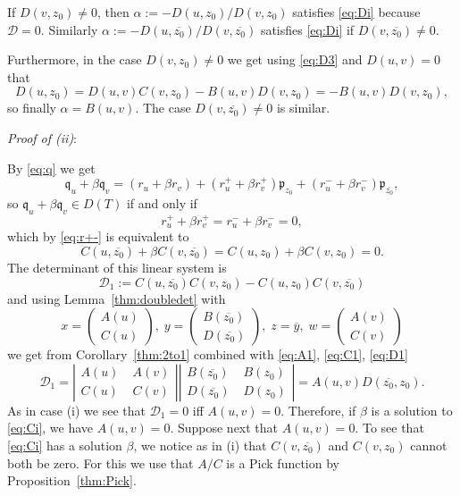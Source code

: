 \documentclass [12pt]{article}
\newcommand{\C}{\mathbb{C}}
\newcommand{\D}{\mathbb{D}}
\begin{document}
If $D(v,z_0)\neq 0$, then $\alpha:=-D(u,z_0)/D(v,z_0)$ satisfies \eqref{eq:Di} because $\mathcal D=0$. Similarly $\alpha:=-D(u,\overline{z_0})/D(v,\overline{z_0})$ satisfies \eqref{eq:Di} if $D(v,\overline{z_0})\neq 0$.

Furthermore, in the case $D(v,z_0)\neq 0$ we get using \eqref{eq:D3} and $D(u,v)=0$ that
$$
D(u,z_0)=D(u,v)C(v,z_0)-B(u,v)D(v,z_0)=-B(u,v)D(v,z_0),
$$
so finally $\alpha=B(u,v)$. The case $D(v,\overline{z_0})\neq 0$ is similar.

\medskip
{\it Proof of (ii)}:

By \eqref{eq:q} we get
$$
\mathfrak{q}_u+\beta \mathfrak{q}_v=(r_u+\beta r_v) + (r_u^+ +\beta r_v^+)\mathfrak{p}_{z_0}+
(r_u^- +\beta r_v^-)\mathfrak{p}_{\overline{z_0}},
$$
so $\mathfrak{q}_u+\beta\mathfrak{q}_v\in D(T)$ if and only if 
$$
r_u^+ +\beta r_v^+=r_u^- +\beta r_v^-=0,
$$
which by \eqref{eq:r+-} is equivalent to 
\begin{equation}\label{eq:Ci}
C(u,\overline{z_0})+\beta C(v,\overline{z_0})=C(u,z_0)+\beta C(v,z_0)=0.
\end{equation}
 The determinant of this linear system is 
\begin{equation*}\label{eq:det1}
{\mathcal D}_1:=C(u,\overline{z_0})C(v,z_0)-C(u,z_0)C(v,\overline{z_0})
\end{equation*}
and using Lemma~\ref{thm:doubledet} with
$$
x=\begin{pmatrix} A(u)\\C(u) \end{pmatrix},\; y=\begin{pmatrix}B(\overline{z_0})\\
D(\overline{z_0})\end{pmatrix},\; z=\overline{y},\;w=\begin{pmatrix} A(v)\\C(v)\end{pmatrix}
$$
we get from Corollary~\ref{thm:2to1} combined with \eqref{eq:A1}, \eqref{eq:C1}, \eqref{eq:D1}
$$
{\mathcal D}_1=\left|\begin{array}{cc}
 A(u)&\;A(v)\\C(u)&\;C(v)\end{array}\right|\left|\begin{array}{cc}
 B(\overline{z_0})&\;B(z_0)\\D(\overline{z_0})&\;D(z_0)\end{array}\right|
=A(u,v)D(\overline{z_0},z_0).
$$
As in case (i) we see that
${\mathcal D}_1=0$ iff $A(u,v)=0$.
Therefore, if $\beta$ is a solution to \eqref{eq:Ci}, we have  $A(u,v)=0$. Suppose next that 
$A(u,v)=0$. To see that \eqref{eq:Ci} has a solution $\beta$, we notice as in (i) that $C(v,\overline{z_0})$ and $C(v,z_0)$ cannot both be zero. For this we use that $A/C$ is a Pick function by Proposition~\ref{thm:Pick}.
\end{document}
